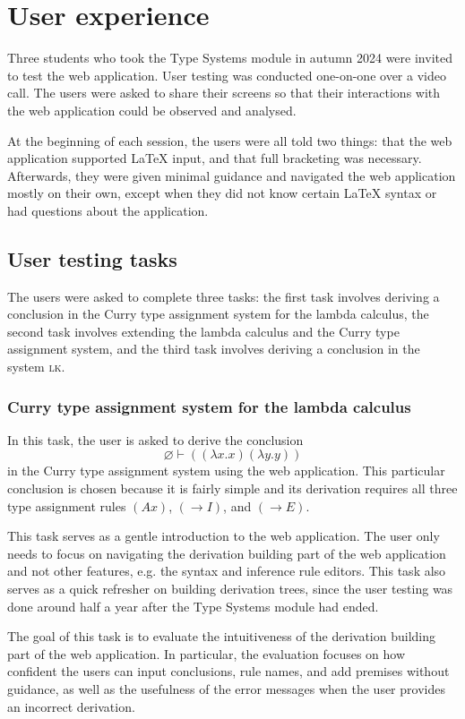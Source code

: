 \section{User experience}
\label{evaluation:ux}
Three students who took the Type Systems module in autumn 2024 were invited to test the web application. User testing was conducted one-on-one over a video call. The users were asked to share their screens so that their interactions with the web application could be observed and analysed.

At the beginning of each session, the users were all told two things: that the web application supported \LaTeX{} input, and that full bracketing was necessary. Afterwards, they were given minimal guidance and navigated the web application mostly on their own, except when they did not know certain \LaTeX{} syntax or had questions about the application.

\subsection{User testing tasks}
The users were asked to complete three tasks: the first task involves deriving a conclusion in the Curry type assignment system for the lambda calculus, the second task involves extending the lambda calculus and the Curry type assignment system, and the third task involves deriving a conclusion in the system \textsc{lk}.

\subsubsection{Curry type assignment system for the lambda calculus}
In this task, the user is asked to derive the conclusion
\[
    \varnothing \vdash ((\lambda x. x)(\lambda y. y))
\]
in the Curry type assignment system using the web application. This particular conclusion is chosen because it is fairly simple and its derivation requires all three type assignment rules $(Ax)$, $(\to I)$, and $(\to E)$.

This task serves as a gentle introduction to the web application. The user only needs to focus on navigating the derivation building part of the web application and not other features, e.g. the syntax and inference rule editors. This task also serves as a quick refresher on building derivation trees, since the user testing was done around half a year after the Type Systems module had ended.

The goal of this task is to evaluate the intuitiveness of the derivation building part of the web application. In particular, the evaluation focuses on how confident the users can input conclusions, rule names, and add premises without guidance, as well as the usefulness of the error messages when the user provides an incorrect derivation.

